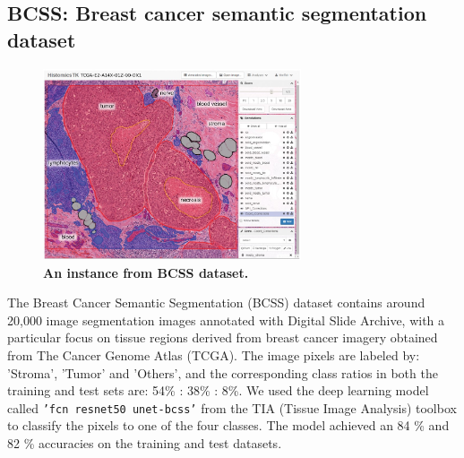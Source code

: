 \documentclass{article}
\begin{document}
%



\subsection{BCSS: Breast cancer semantic segmentation dataset}

\begin{figure}[h]
	\centering
	\includegraphics[width=3in]{img/bcss_instance.jpeg}
	\caption{{\bf An instance from BCSS dataset.}}
	\label{fig:bcss_example}
\end{figure} 

The Breast Cancer Semantic Segmentation (BCSS) dataset \cite{Amgad2019StructuredCE} contains around 20,000 image segmentation images annotated with Digital Slide Archive, with a particular focus on tissue regions derived from breast cancer imagery obtained from The Cancer Genome Atlas (TCGA). The image pixels are labeled by: 'Stroma', 'Tumor' and 'Others', and the corresponding class ratios in both the training and test sets are: 54\% : 38\% : 8\%. We used the deep learning model called \texttt{'fcn resnet50 unet-bcss'} from the TIA (Tissue Image Analysis) toolbox \cite{Pocock2022} to classify the pixels to one of the four classes. The model achieved an 84 \% and 82 \% accuracies on the training and test datasets. 
\end{document}
